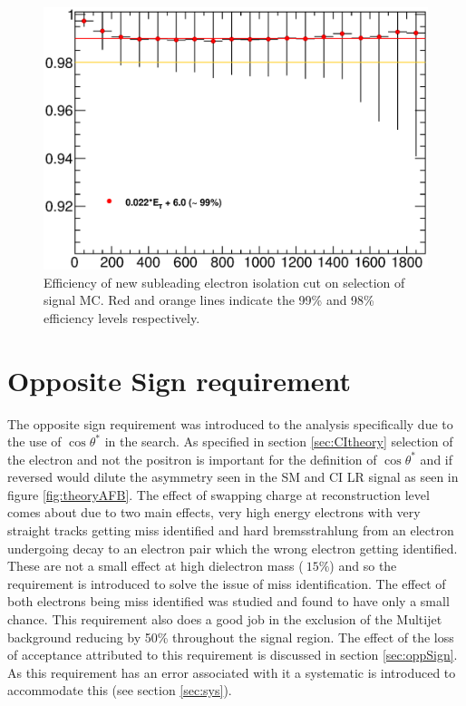    \begin{figure}[h!]
      \begin{center}
      \includegraphics[scale=0.6]{images/C5_sub_iso_efficiency.eps}
      \end{center}
   \caption{Efficiency of new subleading electron isolation cut on selection of signal MC. Red and orange lines indicate the 99\% and 98\% efficiency levels respectively.}
   \label{fig:C5_sub_iso_efficiency}
   \end{figure}



\section{Opposite Sign requirement}

   The opposite sign requirement was introduced to the analysis specifically due to the use of $\cos{\theta^{*}}$ in the search. As specified in section \ref{sec:CItheory} selection of the electron and not the positron is important for the definition of $\cos{\theta^{*}}$ and if reversed would dilute the asymmetry seen in the SM and CI LR signal as seen in figure \ref{fig:theoryAFB}. The effect of swapping charge at reconstruction level comes about due to two main effects, very high energy electrons with very straight tracks getting miss identified and hard bremsstrahlung from an electron undergoing decay to an electron pair which the wrong electron getting identified. These are not a small effect at high dielectron mass ($~ 15\%$) and so the requirement is introduced to solve the issue of miss identification. The effect of both electrons being miss identified was studied and found to have only a small chance. This requirement also does a good job in the exclusion of the Multijet background reducing by 50\% throughout the signal region. The effect of the loss of acceptance attributed to this requirement is discussed in section \ref{sec:oppSign}. As this requirement has an error associated with it a systematic is introduced to accommodate this (see section \ref{sec:sys}). 



